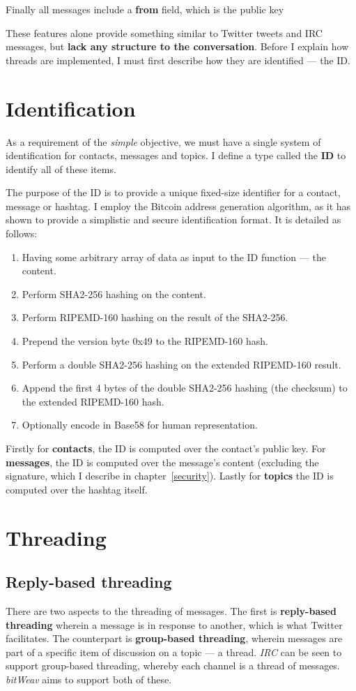 \documentclass[10pt,a4paper,onecolumn]{article}
\begin{document}
Finally all messages include a \textbf{from} field, which is the public key

These features alone provide something similar to Twitter tweets and IRC messages, but \textbf{lack any structure to the conversation}. Before I explain how threads are implemented, I must first describe how they are identified — the ID.

\section{Identification}
\label{id}
As a requirement of the \emph{simple} objective, we must have a single system of identification for contacts, messages and topics. I define a type called the \textbf{ID} to identify all of these items. 

The purpose of the ID is to provide a unique fixed-size identifier for a contact, message or hashtag. I employ the Bitcoin address generation algorithm\cite{btcAddr}, as it has shown to provide a simplistic and secure identification format. It is detailed as follows:
\begin{enumerate}
\item Having some arbitrary array of data as input to the ID function — the content.
\item Perform SHA2-256 hashing on the content.
\item Perform RIPEMD-160 hashing on the result of the SHA2-256.
\item Prepend the version byte 0x49 to the RIPEMD-160 hash.
\item Perform a double SHA2-256 hashing on the extended RIPEMD-160 result.
\item Append the first 4 bytes of the double SHA2-256 hashing (the checksum) to the extended RIPEMD-160 hash.
\item Optionally encode in Base58 for human representation. 
\end{enumerate}

Firstly for \textbf{contacts}, the ID is computed over the contact's public key. For \textbf{messages}, the ID is computed over the message's content (excluding the signature, which I describe in chapter~\ref{security}). Lastly for \textbf{topics} the ID is computed over the hashtag itself.

\section{Threading}
\subsection*{Reply-based threading}
There are two aspects to the threading of messages. The first is \textbf{reply-based threading} wherein a message is in response to another, which is what Twitter facilitates. The counterpart is \textbf{group-based threading}, wherein messages are part of a specific item of discussion on a topic — a thread. \textit{IRC} can be seen to support group-based threading, whereby each channel is a thread of messages. \textit{bitWeav} aims to support both of these. 
\end{document}
